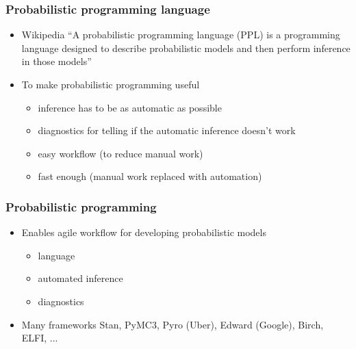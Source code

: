 \documentclass[10pt,handout]{beamer}
\begin{document}
\begin{frame}

\frametitle{Probabilistic programming language}

  \begin{itemize}
  \item Wikipedia ``A probabilistic programming language (PPL) is a
    programming language designed to describe probabilistic models
    and then perform inference in those models''
    \pause
  \item To make probabilistic programming useful
    \begin{itemize}
    \item inference has to be as automatic as possible
    \item diagnostics for telling if the automatic inference doesn't work
    \item easy workflow (to reduce manual work)
    \item fast enough (manual work replaced with automation)
    \end{itemize}
  \end{itemize}
\end{frame}

\begin{frame}

\frametitle{Probabilistic programming}

  \begin{itemize}
  \item Enables agile workflow for developing probabilistic models
    \begin{itemize}
    \item language
    \item automated inference
    \item diagnostics
    \end{itemize}
  \item Many frameworks
    Stan, PyMC3, Pyro (Uber), Edward (Google), Birch, ELFI, ...
  \end{itemize}

\end{frame}
\end{document}
